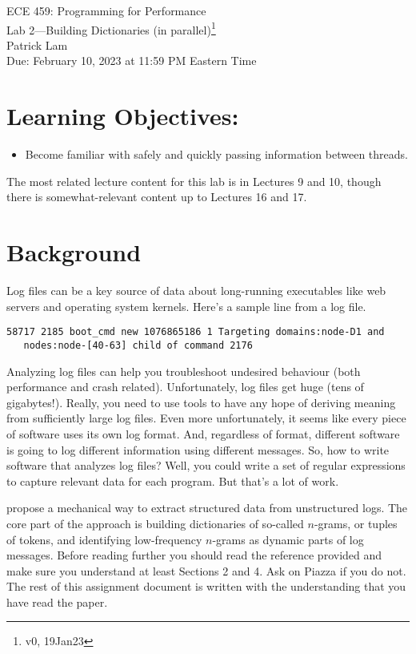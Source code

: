 \documentclass[12pt]{article}
\renewcommand{\_}{\kern-1.5pt\textunderscore\kern-1.5pt}
\begin{document}
\begin{center}
{\Large ECE 459: Programming for Performance}\\
{\Large Lab 2---Building Dictionaries (in parallel)\footnote{v0, 19Jan23}}\\[1em]
Patrick Lam\\
Due: February 10, 2023 at 11:59 PM Eastern Time
\end{center}

\section*{Learning Objectives:}

\begin{itemize}[noitemsep]
	\item Become familiar with safely and quickly passing information between threads.
\end{itemize}

The most related lecture content for this lab is in Lectures 9 and 10, though there is somewhat-relevant content up to Lectures 16 and 17. 

\section*{Background}
Log files can be a key source of data about long-running executables like web servers and operating system kernels. Here's a sample line from a log file.

\begin{verbatim}
58717 2185 boot_cmd new 1076865186 1 Targeting domains:node-D1 and
   nodes:node-[40-63] child of command 2176
\end{verbatim}

Analyzing log files can help you troubleshoot undesired behaviour (both performance and crash related). Unfortunately, log files get huge (tens of gigabytes!). Really, you need to use tools to have any hope of deriving meaning from sufficiently large log files. Even more unfortunately, it seems like every piece of software uses its own log format. And, regardless of format, different software is going to log different information using different messages. So, how to write software that analyzes log files? Well, you could write a set of regular expressions to capture relevant data for each program. But that's a lot of work.

\cite{dai22} propose a mechanical way to extract structured data from unstructured logs. The core part of the approach is building dictionaries of so-called $n$-grams, or tuples of tokens, and identifying low-frequency $n$-grams as dynamic parts of log messages. Before reading further you should read the reference provided and make sure you understand at least Sections 2 and 4. Ask on Piazza if you do not. The rest of this assignment document is written with the understanding that you have read the paper.
\end{document}
